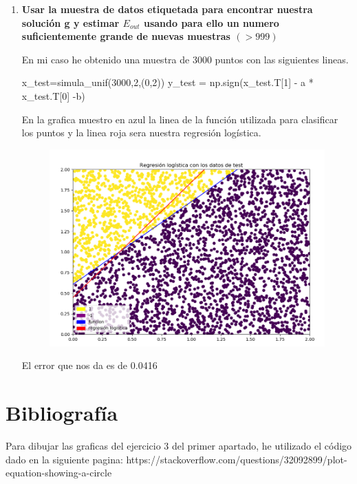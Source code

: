 \documentclass[titlepage]{article}
\begin{document}
\begin{enumerate}
		\item 
		\textbf{Usar la muestra de datos etiquetada para encontrar nuestra solución g y estimar $E_{{ out }}$ usando para ello un numero suficientemente grande de nuevas muestras $(>999)$}
		
		En mi caso he obtenido una muestra de 3000 puntos con las siguientes lineas.
		\newline
		
		x\_test=simula\_unif(3000,2,(0,2))
		\newline
		y\_test = np.sign(x\_test.T[1] - a * x\_test.T[0] -b)
		
		En la grafica muestro en azul la linea de la función utilizada para clasificar los puntos y la linea roja sera nuestra regresión logística.
		\begin{figure}[H]
			\centering
			\includegraphics[width=0.7\linewidth]{screenshot012}
			\caption{}
			\label{fig:screenshot012}
		\end{figure}
		El error que nos da es de 0.0416
		
		\end{enumerate}
		
		\newpage
		
		\section{Bibliografía}
		
		Para dibujar las graficas del ejercicio 3 del primer apartado, he utilizado el código dado en la siguiente pagina:
		\newline
		https://stackoverflow.com/questions/32092899/plot-equation-showing-a-circle
	
	
	
	
	
	
	
 
  
\end{document}
